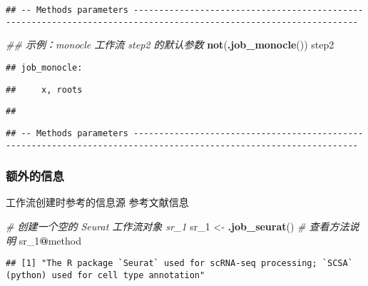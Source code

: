 \documentclass[
]{article}
\newenvironment{Shaded}{\begin{snugshade}}{\end{snugshade}}
\newcommand{\CommentTok}[1]{\textcolor[rgb]{0.56,0.35,0.01}{\textit{#1}}}
\newcommand{\DecValTok}[1]{\textcolor[rgb]{0.00,0.00,0.81}{#1}}
\newcommand{\KeywordTok}[1]{\textcolor[rgb]{0.13,0.29,0.53}{\textbf{#1}}}
\newcommand{\NormalTok}[1]{#1}
\newcommand{\OperatorTok}[1]{\textcolor[rgb]{0.81,0.36,0.00}{\textbf{#1}}}
\newcommand{\StringTok}[1]{\textcolor[rgb]{0.31,0.60,0.02}{#1}}
\begin{document}
\begin{verbatim}
## -- Methods parameters ------------------------------------------------------------------------------------------------------------------
\end{verbatim}

\begin{Shaded}
\begin{Highlighting}[]
\CommentTok{\#\# 示例：monocle 工作流 step2 的默认参数}
\KeywordTok{not}\NormalTok{(}\KeywordTok{.job\_monocle}\NormalTok{())}
\NormalTok{step2}
\end{Highlighting}
\end{Shaded}

\begin{verbatim}
## job_monocle:
\end{verbatim}

\begin{verbatim}
##     x, roots
\end{verbatim}

\begin{verbatim}
## 
\end{verbatim}

\begin{verbatim}
## -- Methods parameters ------------------------------------------------------------------------------------------------------------------
\end{verbatim}

\hypertarget{ux989dux5916ux7684ux4fe1ux606f}{%
\subsubsection{额外的信息}\label{ux989dux5916ux7684ux4fe1ux606f}}

工作流创建时参考的信息源
参考文献信息

\begin{Shaded}
\begin{Highlighting}[]
\CommentTok{\# 创建一个空的 Seurat 工作流对象 \textquotesingle{}sr\_1\textquotesingle{}}
\NormalTok{sr\_}\DecValTok{1}\NormalTok{ \textless{}{-}}\StringTok{ }\KeywordTok{.job\_seurat}\NormalTok{()}
\CommentTok{\# 查看方法说明}
\NormalTok{sr\_}\DecValTok{1}\OperatorTok{@}\NormalTok{method}
\end{Highlighting}
\end{Shaded}

\begin{verbatim}
## [1] "The R package `Seurat` used for scRNA-seq processing; `SCSA` (python) used for cell type annotation"
\end{verbatim}
\end{document}
